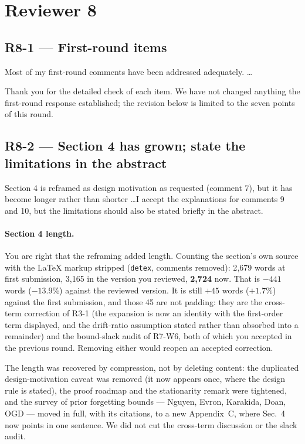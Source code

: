 \section{Reviewer 8}

\subsection*{R8-1 --- First-round items}

\begin{rquote}
Most of my first-round comments have been addressed adequately. \ldots
\end{rquote}

\resp Thank you for the detailed check of each item. We have not changed anything the
first-round response established; the revision below is limited to the seven points of this
round.

\subsection*{R8-2 --- Section 4 has grown; state the limitations in the abstract}

\begin{rquote}
Section 4 is reframed as design motivation as requested (comment 7), but it has become longer
rather than shorter \ldots I accept the explanations for comments 9 and 10, but the
limitations should also be stated briefly in the abstract.
\end{rquote}

\paragraph{Section 4 length.} You are right that the reframing added length. Counting the
section's own source with the LaTeX markup stripped (\texttt{detex}, comments removed):
2{,}679 words at first submission, 3{,}165 in the version you reviewed, \textbf{2{,}724} now.
That is $-441$ words ($-13.9\%$) against the reviewed version. It is still $+45$ words
($+1.7\%$) against the first submission, and those 45 are not padding: they are the
cross-term correction of R3-1 (the expansion is now an identity with the first-order term
displayed, and the drift-ratio assumption stated rather than absorbed into a remainder) and
the bound-slack audit of R7-W6, both of which you accepted in the previous round. Removing
either would reopen an accepted correction.

The length was recovered by compression, not by deleting content: the duplicated
design-motivation caveat was removed (it now appears once, where the design rule is stated),
the proof roadmap and the stationarity remark were tightened, and the survey of prior
forgetting bounds --- Nguyen, Evron, Karakida, Doan, OGD --- moved in full, with its
citations, to a new Appendix~C, where Sec.~4 now points in one sentence.
We did not cut the cross-term discussion or the slack audit.

